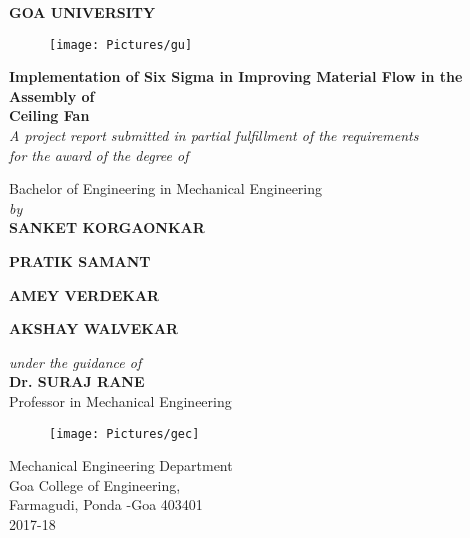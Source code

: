 \documentclass[10pt, a4paper, oneside]{Thesis} %
\title{\ttitle}
\begin{document}
\makeatletter
\renewcommand*{\NAT@nmfmt}[1]{\textsc{#1}}
\makeatother
{}
\fancyhead{}
\rhead{\thepage}
\lhead{}
\pagestyle{fancy}
\hypersetup{pdfsubject=\subjectname}
\hypersetup{pdfauthor=\authornames}
\hypersetup{pdfkeywords=\keywordnames}

\begin{titlepage}
\begin{center}

\huge \textbf{GOA UNIVERSITY}\\[.4cm]

\begin{figure}[htbp]
  \centering
  \texttt{[image: Pictures/gu]}
\end{figure}
%
%
%
%
%
%
{\huge \bfseries Implementation of Six Sigma in Improving Material Flow in the Assembly of \\ Ceiling Fan}\\[0.5cm] 
 \large \textit{A project report submitted in partial fulfillment of the requirements \\for the award of the degree of}
 
\Large Bachelor of Engineering in Mechanical Engineering\\[.25cm]

\large \textit{by}\\[.4cm]


%
%
%
%
%
%
\textbf{SANKET KORGAONKAR}

\textbf{PRATIK SAMANT}

\textbf{AMEY VERDEKAR}

\textbf{AKSHAY WALVEKAR}\\[.55cm]

\large \textit{under the guidance of}\\[0.05cm]

%
%
%
%
%
%
 \Large \textbf{Dr. SURAJ RANE}\\[0.01cm]

%
%
%
Professor in Mechanical Engineering\\[0.5cm]

\graphicspath{ {./Figures/} }
\begin{figure}[htbp]
  \centering
  \texttt{[image: Pictures/gec]}
\end{figure}

Mechanical Engineering Department\\[0.01cm]
Goa College of Engineering, \\[0.01cm]
Farmagudi, Ponda -Goa 403401\\[0.55cm]

2017-18

\end{center}
\end{titlepage}
\end{document}
